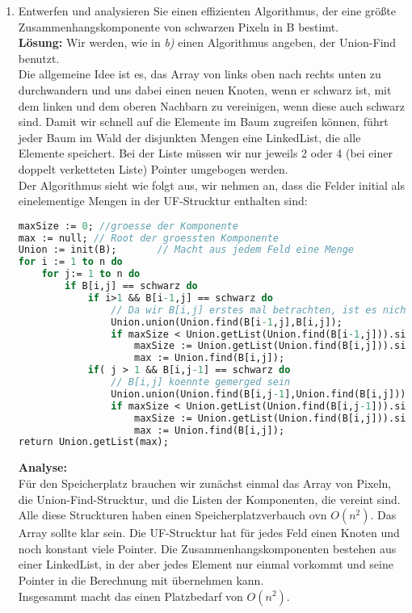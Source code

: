 \documentclass[11pt,a4paper,ngerman]{article}
\begin{document}
\begin{enumerate}[\bfseries (a)]

\item Entwerfen und analysieren Sie einen effizienten Algorithmus, der eine größte Zusammenhangskomponente von schwarzen Pixeln in B bestimt.\\

\textbf{Lösung:}
Wir werden, wie in \emph{b)} einen Algorithmus angeben, der Union-Find benutzt.\\
Die allgemeine Idee ist es, das Array von links oben nach rechts unten zu durchwandern und uns dabei einen neuen Knoten, wenn er schwarz ist, mit dem linken und dem oberen Nachbarn zu vereinigen, wenn diese auch schwarz sind. Damit wir schnell auf die Elemente im Baum zugreifen können, führt jeder Baum im Wald der disjunkten Mengen eine LinkedList, die alle Elemente speichert.
Bei der Liste müssen wir nur jeweils 2 oder 4 (bei einer doppelt verketteten Liste) Pointer umgebogen werden.\\
Der Algorithmus sieht wie folgt aus, wir nehmen an, dass die Felder initial als einelementige Mengen in der UF-Strucktur enthalten sind:
\begin{lstlisting}[language=Pascal]
maxSize := 0; //groesse der Komponente
max := null; // Root der groessten Komponente
Union := init(B);		// Macht aus jedem Feld eine Menge
for i := 1 to n do
	for j:= 1 to n do
		if B[i,j] == schwarz do
			if i>1 && B[i-1,j] == schwarz do
				// Da wir B[i,j] erstes mal betrachten, ist es nicht gemerged.
				Union.union(Union.find(B[i-1,j],B[i,j]);
				if maxSize < Union.getList(Union.find(B[i-1,j])).size() do				
					maxSize := Union.getList(Union.find(B[i,j])).size();
					max := Union.find(B[i,j]);
			if( j > 1 && B[i,j-1] == schwarz do
				// B[i,j] koennte gemerged sein
				Union.union(Union.find(B[i,j-1],Union.find(B[i,j]));
				if maxSize < Union.getList(Union.find(B[i,j-1])).size() do				
					maxSize := Union.getList(Union.find(B[i,j])).size();
					max := Union.find(B[i,j]);
return Union.getList(max);
\end{lstlisting}

\textbf{Analyse:}\\
Für den Speicherplatz brauchen wir zunächst einmal das Array von Pixeln, die Union-Find-Strucktur, und die Listen der Komponenten, die vereint sind.\\
Alle diese Struckturen haben einen Speicherplatzverbauch ovn $O(n^2)$. Das Array sollte klar sein. Die UF-Strucktur hat für jedes Feld einen Knoten und noch konstant viele Pointer. Die Zusammenhangskomponenten bestehen aus einer LinkedList, in der aber jedes Element nur einmal vorkommt und seine Pointer in die Berechnung mit übernehmen kann.\\
Insgesammt macht das einen Platzbedarf von $O(n^2)$.\\


\end{enumerate}
\end{document}
